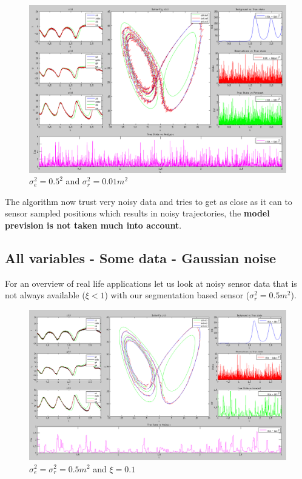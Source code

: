 \documentclass[11pt,a4paper]{article}
\begin{document}
\vskip 0.5cm
\begin{figure}[H]
   \includegraphics[width=16cm]{Q11c.png}
   \caption{$\sigma_e^2 = 0.5^2$ and $\sigma_r^2 = 0.01m^2$}
\end{figure}
\vskip 0.5cm

The algorithm now trust very noisy data and tries to get as close as it can to sensor sampled positions which results in noisy trajectories, the \textbf{model prevision is not taken much into account}.

\clearpage
\subsection{All variables - Some data - Gaussian noise}

For an overview of real life applications let us look at noisy sensor data that is not always available ($\xi < 1$) with our segmentation based sensor ($\sigma_r^2 = 0.5m^2$).

\begin{figure}[H]
   \includegraphics[width=14cm]{Q12a.png}
   \caption{$\sigma_e^2 = \sigma_r^2 = 0.5m^2$ and $\xi = 0.1$}
\end{figure}
\end{document}
